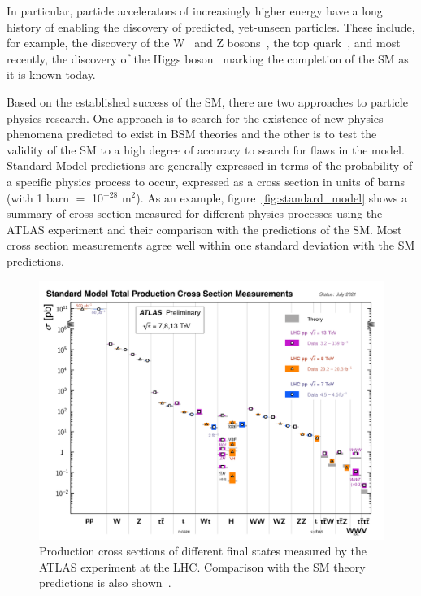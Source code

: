 In particular, particle accelerators of increasingly higher energy have a long history of enabling the discovery of predicted, yet-unseen particles. These include, for example, the discovery of the W~\cite{arnison_W_1983, banner_observation_1983} and Z bosons~\cite{arnison_Z_1983, bagnaia_evidence_1983}, the top quark~\cite{cdf_collaboration_observation_1995, d0_collaboration_observation_1995}, and most recently, the discovery of the Higgs boson~\cite{the_atlas_collaboration_observation_2012, the_cms_collaboration_observation_2012} marking the completion of the SM as it is known today.

Based on the established success of the SM, there are two approaches to particle physics research. One approach is to search for the existence of new physics phenomena predicted to exist in BSM theories and the other is to test the validity of the SM to a high degree of accuracy to search for flaws in the model. Standard Model predictions are generally expressed in terms of the probability of a specific physics process to occur, expressed as a cross section in units of barns (with 1 barn $=$ 10$^{-28}$ m$^{2}$).  As an example, figure~\ref{fig:standard_model} shows a summary of cross section measured for different physics processes using the ATLAS experiment and their comparison with the predictions of the SM. Most cross section measurements agree well within one standard deviation with the SM predictions. 

\begin{figure}
    \centering
    \includegraphics[width = \textwidth]{figures/atlas_cross_sections.png}
    \caption{Production cross sections of different final states measured by the ATLAS experiment at the LHC. Comparison with the SM theory predictions is also shown~\cite{atlas_public_web_sm}.}
    \label{fig:atlas_cross_sections}
\end{figure}

